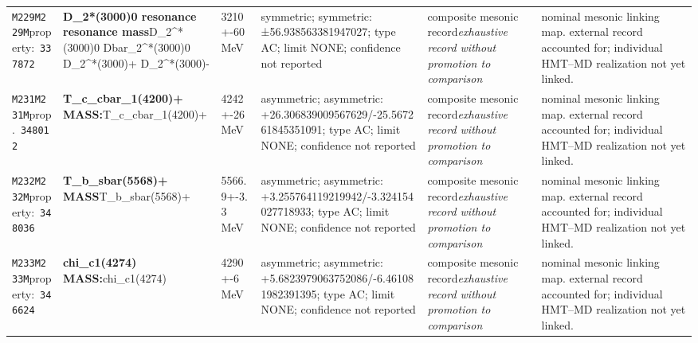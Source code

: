 \begin{landscape}
\begin{longtable}{L{1.85cm}L{4.45cm}L{2.35cm}L{4.05cm}L{3.35cm}L{7.15cm}}
\texttt{M229}\newline \texttt{M229M}\newline property:\ \texttt{337872} & \textbf{D\_\allowbreak{}2*(3000)0 resonance resonance mass}\newline D\_\allowbreak{}2\textasciicircum{}*(3000)0 \textbar{}\allowbreak{} Dbar\_\allowbreak{}2\textasciicircum{}*(3000)0 \textbar{}\allowbreak{} D\_\allowbreak{}2\textasciicircum{}*(3000)+ \textbar{}\allowbreak{} D\_\allowbreak{}2\textasciicircum{}*(3000)- & 3210+-60\,MeV & symmetric; symmetric: ±56.938563381947027; type AC; limit NONE; confidence not reported & composite mesonic record\newline \emph{exhaustive record without promotion to comparison} & nominal mesonic linking map. external record accounted for; individual HMT--MD realization not yet linked. \\
\texttt{M231}\newline \texttt{M231M}\newline prop.\ \texttt{348012} & \textbf{T\_\allowbreak{}c\_\allowbreak{}cbar\_\allowbreak{}1(4200)+ MASS:}\newline T\_\allowbreak{}c\_\allowbreak{}cbar\_\allowbreak{}1(4200)+ & 4242+-26\,MeV & asymmetric; asymmetric: +26.306839009567629/-25.567261845351091; type AC; limit NONE; confidence not reported & composite mesonic record\newline \emph{exhaustive record without promotion to comparison} & nominal mesonic linking map. external record accounted for; individual HMT--MD realization not yet linked. \\
\texttt{M232}\newline \texttt{M232M}\newline property:\ \texttt{348036} & \textbf{T\_\allowbreak{}b\_\allowbreak{}sbar(5568)+ MASS}\newline T\_\allowbreak{}b\_\allowbreak{}sbar(5568)+ & 5566.9+-3.3\,MeV & asymmetric; asymmetric: +3.255764119219942/-3.324154027718933; type AC; limit NONE; confidence not reported & composite mesonic record\newline \emph{exhaustive record without promotion to comparison} & nominal mesonic linking map. external record accounted for; individual HMT--MD realization not yet linked. \\
\texttt{M233}\newline \texttt{M233M}\newline property:\ \texttt{346624} & \textbf{chi\_\allowbreak{}c1(4274) MASS:}\newline chi\_\allowbreak{}c1(4274) & 4290+-6\,MeV & asymmetric; asymmetric: +5.6823979063752086/-6.461081982391395; type AC; limit NONE; confidence not reported & composite mesonic record\newline \emph{exhaustive record without promotion to comparison} & nominal mesonic linking map. external record accounted for; individual HMT--MD realization not yet linked. \\

\end{longtable}
\end{landscape}
